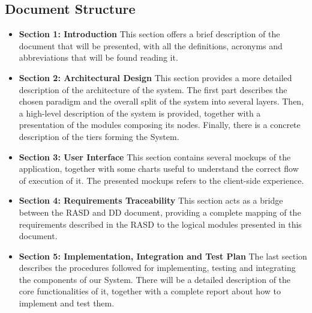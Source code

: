 \subsection{Document Structure}
\begin{itemize}
    \item \textbf{Section 1: Introduction}\newline
    This section offers a brief description of the document that will be presented, with all the definitions, acronyms and abbreviations that
    will be found reading it.
    \item \textbf{Section 2: Architectural Design} \newline
    This section provides a more detailed description of the architecture of the system. The first part describes the chosen paradigm and 
    the overall split of the system into several layers. Then, a high-level description of the system is provided, 
    together with a presentation of the modules composing its nodes. Finally, there is a concrete description of the tiers forming the System.
    \item \textbf{Section 3: User Interface} \newline
    This section contains several mockups of the application, together with some charts useful to
    understand the correct flow of execution of it. The presented mockups refers to the client-side experience.
    \item \textbf{Section 4: Requirements Traceability} \newline
    This section acts as a bridge between the RASD and DD document, providing a complete mapping of the requirements described in the RASD 
    to the logical modules presented in this document. 
    \item \textbf{Section 5: Implementation, Integration and Test Plan} \newline
    The last section describes the procedures followed for implementing, testing and integrating the
    components of our System. There will be a detailed description of the core functionalities of it, together with a complete report about how to
    implement and test them.
\end{itemize}